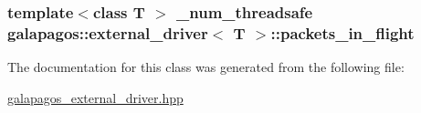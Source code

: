 \subsubsection[{\texorpdfstring{packets\+\_\+in\+\_\+flight}{packets_in_flight}}]{\setlength{\rightskip}{0pt plus 5cm}template$<$class T $>$ {\bf \+\_\+num\+\_\+threadsafe} {\bf galapagos\+::external\+\_\+driver}$<$ {\bf T} $>$\+::packets\+\_\+in\+\_\+flight\hspace{0.3cm}{\ttfamily [protected]}}\hypertarget{classgalapagos_1_1external__driver_a66c3c0c6b022c1335beda3de4f18ced8}{}\label{classgalapagos_1_1external__driver_a66c3c0c6b022c1335beda3de4f18ced8}


The documentation for this class was generated from the following file\+:\begin{DoxyCompactItemize}
\item 
\hyperlink{galapagos__external__driver_8hpp}{galapagos\+\_\+external\+\_\+driver.\+hpp}\end{DoxyCompactItemize}
